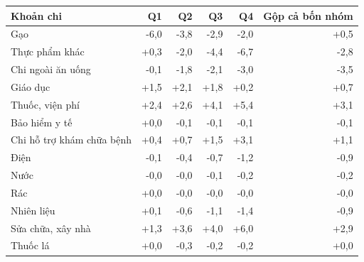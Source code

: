 \begin{tabular}{lrrrrr}
\toprule
Khoản chi & Q1 & Q2 & Q3 & Q4 & Gộp cả bốn nhóm \\
\midrule
Gạo & -6,0 & -3,8 & -2,9 & -2,0 & +0,5 \\
Thực phẩm khác & +0,3 & -2,0 & -4,4 & -6,7 & -2,8 \\
Chi ngoài ăn uống & -0,1 & -1,8 & -2,1 & -3,0 & -3,5 \\
Giáo dục & +1,5 & +2,1 & +1,8 & +0,2 & +0,7 \\
Thuốc, viện phí & +2,4 & +2,6 & +4,1 & +5,4 & +3,1 \\
Bảo hiểm y tế & +0,0 & -0,1 & -0,1 & -0,1 & -0,1 \\
Chi hỗ trợ khám chữa bệnh & +0,4 & +0,7 & +1,5 & +3,1 & +1,1 \\
Điện & -0,1 & -0,4 & -0,7 & -1,2 & -0,9 \\
Nước & -0,0 & -0,0 & -0,1 & -0,2 & -0,2 \\
Rác & +0,0 & -0,0 & -0,0 & -0,0 & -0,0 \\
Nhiên liệu & +0,1 & -0,6 & -1,1 & -1,4 & -0,9 \\
Sửa chữa, xây nhà & +1,3 & +3,6 & +4,0 & +6,0 & +2,9 \\
Thuốc lá & +0,0 & -0,3 & -0,2 & -0,2 & +0,0 \\
\bottomrule
\end{tabular}
